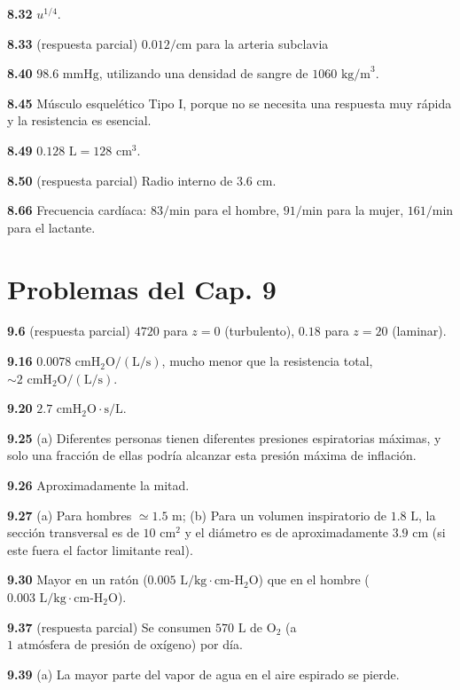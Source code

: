 \documentclass[12pt,a4paper]{book}
\begin{document}
\noindent \textbf{8.32} $u^{1/4}$.

\noindent \textbf{8.33} (respuesta parcial) $0.012/\text{cm}$ para la arteria subclavia

\noindent \textbf{8.40} $98.6\text{ mmHg}$, utilizando una densidad de sangre de $1060\text{ kg/m}^3$.

\noindent \textbf{8.45} Músculo esquelético Tipo I, porque no se necesita una respuesta muy rápida y la resistencia es esencial.

\noindent \textbf{8.49} $0.128\text{ L} = 128\text{ cm}^3$.

\noindent \textbf{8.50} (respuesta parcial) Radio interno de $3.6\text{ cm}$.

\noindent \textbf{8.66} Frecuencia cardíaca: $83/\text{min}$ para el hombre, $91/\text{min}$ para la mujer, $161/\text{min}$ para el lactante.

\section*{Problemas del Cap. 9}

\noindent \textbf{9.6} (respuesta parcial) $4720$ para $z = 0$ (turbulento), $0.18$ para $z = 20$ (laminar).

\noindent \textbf{9.16} $0.0078\text{ cmH}_2\text{O}/(\text{L/s})$, mucho menor que la resistencia total, $\sim 2\text{ cmH}_2\text{O}/(\text{L/s})$.

\noindent \textbf{9.20} $2.7\text{ cmH}_2\text{O}\cdot\text{s/L}$.

\noindent \textbf{9.25} (a) Diferentes personas tienen diferentes presiones espiratorias máximas, y solo una fracción de ellas podría alcanzar esta presión máxima de inflación.

\noindent \textbf{9.26} Aproximadamente la mitad.

\noindent \textbf{9.27} (a) Para hombres $\simeq 1.5\text{ m}$; (b) Para un volumen inspiratorio de $1.8\text{ L}$, la sección transversal es de $10\text{ cm}^2$ y el diámetro es de aproximadamente $3.9\text{ cm}$ (si este fuera el factor limitante real).

\noindent \textbf{9.30} Mayor en un ratón ($0.005\text{ L/kg}\cdot\text{cm-H}_2\text{O}$) que en el hombre ($0.003\text{ L/kg}\cdot\text{cm-H}_2\text{O}$).

\noindent \textbf{9.37} (respuesta parcial) Se consumen $570\text{ L de O}_2$ (a $1\text{ atmósfera de presión de oxígeno}$) por día.

\noindent \textbf{9.39} (a) La mayor parte del vapor de agua en el aire espirado se pierde.
\end{document}
